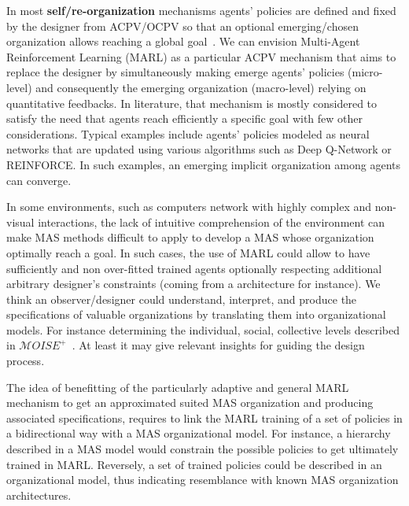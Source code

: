 \documentclass[runningheads]{llncs}
\begin{document}
In most \textbf{self/re-organization} mechanisms agents' policies are defined and fixed by the designer from ACPV/OCPV so that an optional emerging/chosen organization allows reaching a global goal~\cite{Picard2009}. We can envision Multi-Agent Reinforcement Learning (MARL) as a particular ACPV mechanism that aims to replace the designer by simultaneously making emerge agents' policies (micro-level) and consequently the emerging organization (macro-level) relying on quantitative feedbacks. In literature, that mechanism is mostly considered to satisfy the need that agents reach efficiently a specific goal with few other considerations. Typical examples include agents' policies modeled as neural networks that are updated using various algorithms such as Deep Q-Network or REINFORCE. In such examples, an emerging implicit organization among agents can converge.

In some environments, such as computers network with highly complex and non-visual interactions, the lack of intuitive comprehension of the environment can make MAS methods difficult to apply to develop a MAS whose organization optimally reach a goal. In such cases, the use of MARL could allow to have sufficiently and non over-fitted trained agents optionally respecting additional arbitrary designer's constraints (coming from a architecture for instance). We think an observer/designer could understand, interpret, and produce the specifications of valuable organizations by translating them into organizational models. For instance determining the individual, social, collective levels described in $\mathcal{M}OISE^{+}$~\cite{Hubner2002}. At least it may give relevant insights for guiding the design process.

The idea of benefitting of the particularly adaptive and general MARL mechanism to get an approximated suited MAS organization and producing associated specifications, requires to link the MARL training of a set of policies in a bidirectional way with a MAS organizational model. For instance, a hierarchy described in a MAS model would constrain the possible policies to get ultimately trained in MARL. Reversely, a set of trained policies could be described in an organizational model, thus indicating resemblance with known MAS organization architectures.
\end{document}
